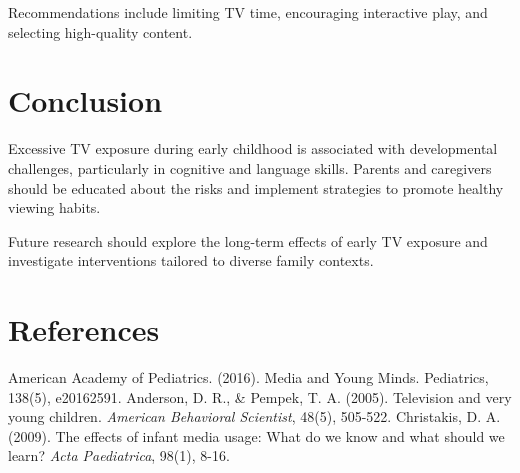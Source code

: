 \documentclass[a4paper,12pt]{article}
\begin{document}
Recommendations include limiting TV time, encouraging interactive play, and selecting high-quality content.

\section{Conclusion}
Excessive TV exposure during early childhood is associated with developmental challenges, particularly in cognitive and language skills. Parents and caregivers should be educated about the risks and implement strategies to promote healthy viewing habits.

Future research should explore the long-term effects of early TV exposure and investigate interventions tailored to diverse family contexts.

\section*{References}
\begin{thebibliography}{9}
 American Academy of Pediatrics. (2016). Media and Young Minds. Pediatrics, 138(5), e20162591.
 Anderson, D. R., \& Pempek, T. A. (2005). Television and very young children. \textit{American Behavioral Scientist}, 48(5), 505-522.
 Christakis, D. A. (2009). The effects of infant media usage: What do we know and what should we learn? \textit{Acta Paediatrica}, 98(1), 8-16.
\end{thebibliography}
\end{document}
